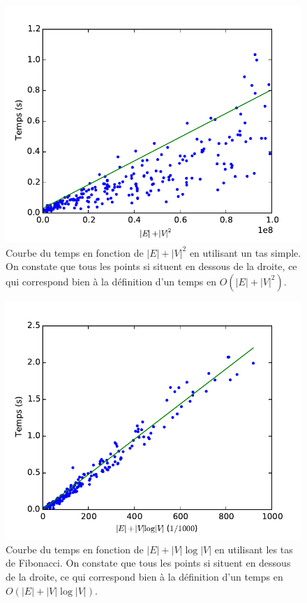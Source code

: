 \documentclass{article}
\begin{document}
\begin{figure}
  \begin{center}
    \includegraphics{reg_queue.pdf}
  \end{center}
  \caption{\label{fig:reg_queue}Courbe du temps en fonction de
    $|E| + |V|^2$ en utilisant un tas simple.
    On constate que tous les points si situent en
    dessous de la droite, ce qui correspond bien à la définition d'un
    temps en $O(|E| + |V|^2)$.}
\end{figure}
\begin{figure}
  \begin{center}
    \includegraphics{reg.pdf}
  \end{center}
  \caption{\label{fig:reg_fib}Courbe du temps en fonction de
    $|E| + |V|\log |V|$ en utilisant les tas de Fibonacci.
    On constate que tous les points si situent en
    dessous de la droite, ce qui correspond bien à la définition d'un
    temps en $O(|E| + |V|\log |V|)$.}
\end{figure}
\end{document}
